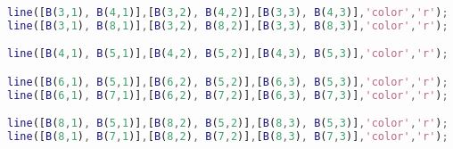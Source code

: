 \begin{lstlisting}[language=matlab]
line([B(3,1), B(4,1)],[B(3,2), B(4,2)],[B(3,3), B(4,3)],'color','r');
line([B(3,1), B(8,1)],[B(3,2), B(8,2)],[B(3,3), B(8,3)],'color','r');

line([B(4,1), B(5,1)],[B(4,2), B(5,2)],[B(4,3), B(5,3)],'color','r');

line([B(6,1), B(5,1)],[B(6,2), B(5,2)],[B(6,3), B(5,3)],'color','r');
line([B(6,1), B(7,1)],[B(6,2), B(7,2)],[B(6,3), B(7,3)],'color','r');

line([B(8,1), B(5,1)],[B(8,2), B(5,2)],[B(8,3), B(5,3)],'color','r');
line([B(8,1), B(7,1)],[B(8,2), B(7,2)],[B(8,3), B(7,3)],'color','r');

\end{lstlisting}
